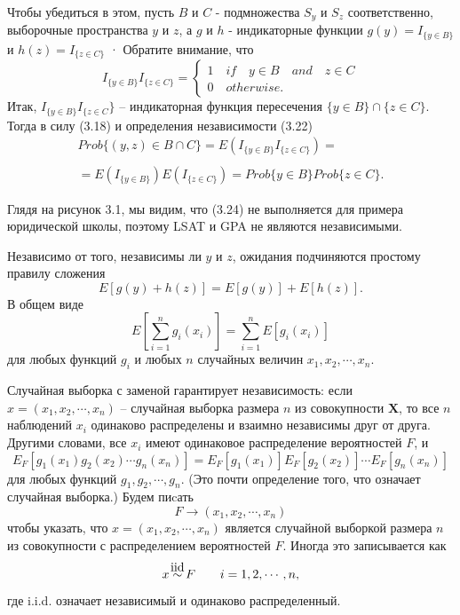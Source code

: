 Чтобы убедиться в этом, пусть $B$ и $C$ - подмножества $S_y$ и $S_z$ соответственно, выборочные пространства $y$ и $z$, а $g$ и $h$ - индикаторные функции $g(y) = I_{\{y\in B\}}$ и $h (z) = I_{\{z\in C\}}$ · Обратите внимание, что 
\begin{equation}
    I_{\{y\in B\}}I_{\{z\in C\}}=\begin{cases}
      1\quad if \quad y\in B\quad and\quad z\in C\\
      0\quad otherwise.
    \end{cases}
\end{equation}
Итак, $I_{\{y\in B\}}I_{\{z\in C}\}$ -- индикаторная функция пересечения ${\{y \in B\}} \cap {\{z \in C\}}$. Тогда в силу (3.18) и определения независимости (3.22) 
\begin{equation}
    \begin{array}{l}
        Prob\{(y,z)\in B\cap C\} = E(I_{\{y\in B\}}I_{\{z\in C\}})=\\ \\
        =E(I_{\{y\in B\}})E(I_{\{z\in C\}}) = Prob\{y\in B\}Prob\{z\in C\}.
    \end{array}
\end{equation}

Глядя на рисунок 3.1, мы видим, что (3.24) не выполняется для примера юридической школы, поэтому LSAT и GPA не являются независимыми. 

Независимо от того, независимы ли $y$ и $z$, ожидания подчиняются простому правилу сложения 
\begin{equation}
    E[g(y)+h(z)]=E[g(y)]+E[h(z)].
\end{equation}
В общем виде
\begin{equation}
    E[\sum_{i=1}^ng_i(x_i)]=\sum_{i=1}^nE[g_i(x_i)]
\end{equation}
для любых функций $g_i$ и любых $n$ случайных величин $x_1, x_2,\cdots, x_n$. 

Случайная выборка с заменой гарантирует независимость: если $x = (x_1, x_2,\cdots, x_n)$ -- случайная выборка размера $n$ из совокупности $\mathbf{X}$, то все $n$ наблюдений $x_i$ одинаково распределены и взаимно независимы друг от друга. Другими словами, все $x_i$ имеют одинаковое распределение вероятностей $F$, и 
\begin{equation}
    E_F[g_1(x_1)g_2(x_2)\cdots g_n(x_n)] = E_F[g_1(x_1)]E_F[g_2(x_2)]\cdots E_F[g_n(x_n)] 
\end{equation}
для любых функций $g_1,g_2,\cdots, g_n$. (Это почти определение того, что означает случайная выборка.) Будем пиcать 
\begin{equation}
    F\rightarrow (x_1,x_2,\cdots,x_n)
\end{equation}
чтобы указать, что $x = (x_1, x_2, \cdots, x_n)$ является случайной выборкой размера $n$ из совокупности с распределением вероятностей $F$. Иногда это записывается как 
\begin{equation}
    x\iid F\qquad i=1,2,\cdots,n,
\end{equation}
где i.i.d. означает независимый и одинаково распределенный.